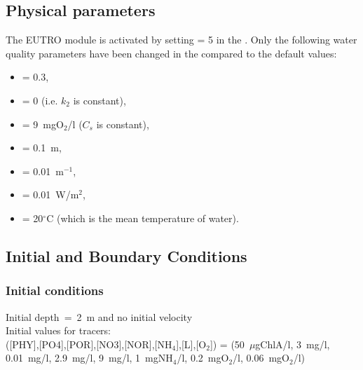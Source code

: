 \subsection{Physical parameters}
%
The EUTRO module is activated by setting  = 5
in the  .
%
Only the following water quality parameters have been changed
in the \waqtel {} compared to the default values:
\begin{itemize}
\item {} = 0.3,
\item {} = 0 (i.e. $k_2$ is constant),
\item {} = 9~mgO$_2$/l ($C_s$ is constant),
\item {} = 0.1~m,
\item {} = 0.01~m$^{-1}$,
\item {} = 0.01~W/m$^2$,
\item {} = 20$^\circ$C (which is the mean temperature of water).
\end{itemize}
%
%
%
%
%
%
\subsection{Initial and Boundary Conditions}
%
\subsubsection{Initial conditions}
%
Initial depth~=~2~m
and no initial velocity\\
Initial values for tracers:\\
([PHY],[PO4],[POR],[NO3],[NOR],[NH$_4$],[L],[O$_2$]) =
(50~$\mu$gChlA/l, 3~mg/l, 0.01~mg/l, 2.9~mg/l, 9~mg/l, 1~mgNH$_4$/l, 0.2~mgO$_2$/l, 0.06~mgO$_2$/l)
%
